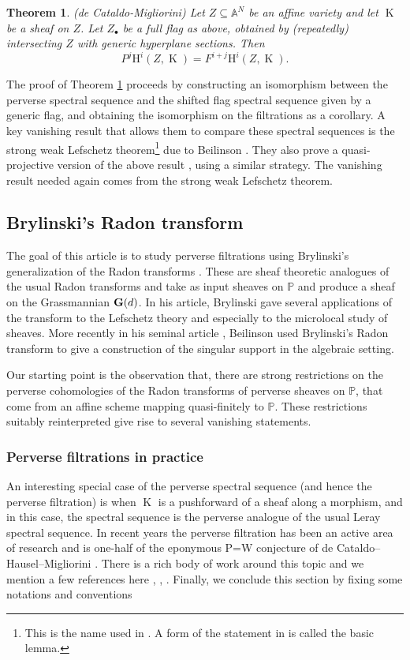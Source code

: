 \documentclass[12pt, reqno]{amsart}
\theoremstyle{plain}
\newtheorem{thm}{\bf Theorem}[subsection]
\theoremstyle{definition}
\theoremstyle{definition}
\newcommand{\bbA}{{\mathbb A}}
\newcommand{\bbP}{{\mathbb P}}
\newcommand{\bG}{{\bf G}}
\DeclareMathOperator{\KK}{K}
\begin{document}
\begin{thm}(de Cataldo-Migliorini)\cite[Theorem 4.1.1]{deCM10}
\label{thm:affine-perverse=geometric}
Let $Z \subseteq \bbA^N$ be an affine variety and let $\KK$ be a sheaf on $Z$. Let $Z_{\bullet}$ be a full flag as above, obtained by (repeatedly) intersecting $Z$ with generic hyperplane sections. Then 
\[
    P^{j}\mathrm{H}^i(Z, \KK) = F^{i+j}\mathrm{H}^i(Z, \KK). 
\]
\end{thm}

The proof of Theorem \ref{thm:affine-perverse=geometric} proceeds by constructing an isomorphism between the perverse spectral sequence and the shifted flag spectral sequence given by a generic flag, and obtaining the isomorphism on the filtrations as a corollary. A key vanishing result that allows them to compare these spectral sequences is the strong weak Lefschetz theorem\footnote{This is the name used in \cite[Theorem 5.1.2]{deCM10}. A form of the statement in \cite{Nor02} is called the basic lemma.} due to Beilinson \cite[Theorem 5.1.2]{deCM10}. They also prove a quasi-projective version of the above result \cite[Theorem 4.2.1]{deCM10}, using a similar strategy. The vanishing result needed again comes from the strong weak Lefschetz theorem. 

\subsection{Brylinski's Radon transform}The goal of this article is to study perverse filtrations using Brylinski's generalization of the Radon transforms \cite{Br}. These are sheaf theoretic analogues of the usual Radon transforms and take as input sheaves on $\bbP$ and produce a sheaf on the Grassmannian $\bG(d)$. In his article, Brylinski gave several applications of the transform to the Lefschetz theory \cite[I.III]{Br} and especially to the microlocal study of sheaves. More recently in his seminal article \cite{B}, Beilinson used Brylinski's Radon transform to give a construction of the singular support in the algebraic setting.

Our starting point is the observation that, there are strong restrictions on the perverse cohomologies of the Radon transforms of perverse sheaves on $\bbP$, that come from an affine scheme mapping quasi-finitely to $\bbP$. These restrictions suitably reinterpreted give rise to several vanishing statements. 

\subsubsection{Perverse filtrations in practice}An interesting special case of the perverse spectral sequence (and hence the perverse filtration) is when $\KK$ is a pushforward of a sheaf along a morphism, and in this case, the spectral sequence is the perverse analogue of the usual Leray spectral sequence. In recent years the perverse filtration has been an active area of research and is one-half of the eponymous P=W conjecture of de Cataldo–Hausel–Migliorini \cite{dHM12}. There is a rich body of work around this topic and we mention a few references here \cite{MS22}, \cite{HMMS22}, \cite{dMS22}. Finally, we conclude this section by fixing some notations and conventions
\end{document}
